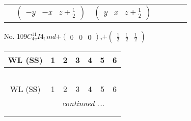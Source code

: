 \documentclass[fleqn,9pt,landscape]{jsarticle}
\begin{document}
\begin{center}
\begin{longtable}{ccccccc}
& $ \begin{pmatrix} - y & - x & z + \frac{1}{2} \end{pmatrix} $ & $ \begin{pmatrix} y & x & z + \frac{1}{2} \end{pmatrix} $ & $  $ & $  $ & $  $ & $  $ \\
\end{longtable}
\end{center}
\newpage
No. 109\quad$C_{4v}^{11}$\quad$I4_1md$\quad[ tetragonal ]\quad$+\begin{pmatrix} 0 & 0 & 0 \end{pmatrix}$,\quad $+\begin{pmatrix} \frac{1}{2} & \frac{1}{2} & \frac{1}{2} \end{pmatrix}$
\begin{center}
\renewcommand{\arraystretch}{1.2}
\begin{longtable}{ccccccc}
 \hline \hline
WL (SS) & 1 & 2 & 3 & 4 & 5 & 6 \\ \hline \endfirsthead

\multicolumn{6}{l}{\tablename\ \thetable{}} \\
 \hline \hline
WL (SS) & 1 & 2 & 3 & 4 & 5 & 6 \\ \hline \endhead

 \hline \hline
\multicolumn{6}{r}{\footnotesize\it continued ...} \\ \endfoot

 \hline \hline
\multicolumn{6}{r}{} \\ \endlastfoot


\end{longtable}
\end{center}
\end{document}
